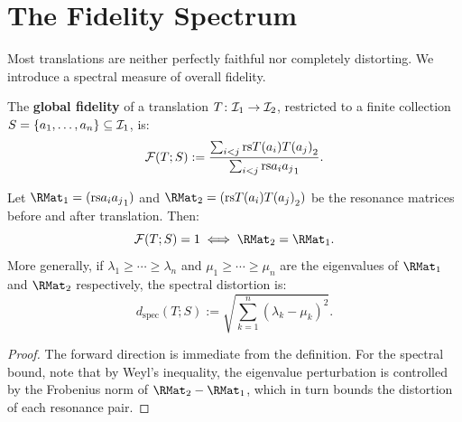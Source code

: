 \section{The Fidelity Spectrum}

Most translations are neither perfectly faithful nor completely distorting.
We introduce a spectral measure of overall fidelity.

\begin{definition}
\label{def:global-fidelity}
The \textbf{global fidelity} of a translation $T\colon \mathcal{I}_1 \to \mathcal{I}_2$,
restricted to a finite collection $S = \{a_1, \ldots, a_n\} \subseteq \mathcal{I}_1$,
is:
\[
  \mathcal{F}(T; S) := \frac{\sum_{i < j} \mathrm{rs}{T(a_i)}{T(a_j)}_2}
  {\sum_{i < j} \mathrm{rs}{a_i}{a_j}_1}.
\]
\end{definition}

\begin{theorem}
\label{thm:fidelity-spectral}
Let $\RMat_1 = (\rs{a_i}{a_j}_1)$ and $\RMat_2 = (\rs{T(a_i)}{T(a_j)}_2)$ be
the resonance matrices before and after translation.  Then:
\[
  \mathcal{F}(T; S) = 1 \iff \RMat_2 = \RMat_1.
\]
More generally, if $\lambda_1 \geq \cdots \geq \lambda_n$ and
$\mu_1 \geq \cdots \geq \mu_n$ are the eigenvalues of $\RMat_1$ and $\RMat_2$
respectively, the spectral distortion is:
\[
  d_{\mathrm{spec}}(T; S) := \sqrt{\sum_{k=1}^{n} (\lambda_k - \mu_k)^2}.
\]
\end{theorem}

\begin{proof}
The forward direction is immediate from the definition.  For the spectral
bound, note that by Weyl's inequality, the eigenvalue perturbation is
controlled by the Frobenius norm of $\RMat_2 - \RMat_1$, which in turn
bounds the distortion of each resonance pair.
\end{proof}

